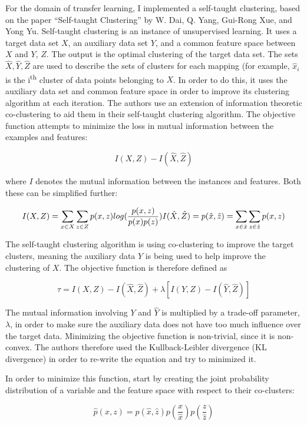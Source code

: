 \documentclass[
]{article}
\date{}
\begin{document}
For the domain of transfer learning, I implemented a self-taught
clustering, based on the paper ``Self-taught Clustering'' by W. Dai, Q.
Yang, Gui-Rong Xue, and Yong Yu. Self-taught clustering is an instance
of unsupervised learning. It uses a target data set \(X\), an auxiliary
data set \(Y\), and a common feature space between \(X\) and \(Y\),
\(Z\). The output is the optimal clustering of the target data set. The
sets \(\hat X, \hat Y, \hat Z\) are used to describe the sets of
clusters for each mapping (for example, \(\hat x_i\) is the
i\textsuperscript{th} cluster of data points belonging to \(X\). In
order to do this, it uses the auxiliary data set and common feature
space in order to improve its clustering algorithm at each iteration.
The authors use an extension of information theoretic co-clustering to
aid them in their self-taught clustering algorithm. The objective
function attempts to minimize the loss in mutual information between the
examples and features:

\[I(X, Z) - I(\hat X, \hat Z)\]

where \(I\) denotes the mutual information between the instances and
features. Both these can be simplified further:

\[I(X, Z) = \sum_{x\in X}\sum_{z\in Z}p(x, z)log(\frac{p(x, z)}{p(x)p(z)}) \\I(\hat X, \hat Z) = p(\hat x, \hat z) = \sum_{x\in\hat x}\sum_{z\in\hat z}p(x, z)\]

The self-taught clustering algorithm is using co-clustering to improve
the target clusters, meaning the auxiliary data \(Y\) is being used to
help improve the clustering of \(X\). The objective function is
therefore defined as

\[\tau = I(X, Z) - I(\hat X, \hat Z) + \lambda\left[I(Y, Z) - I(\hat Y, \hat Z)\right]\]

The mutual information involving \(Y\) and \(\hat Y\) is multiplied by a
trade-off parameter, \(\lambda\), in order to make sure the auxiliary
data does not have too much influence over the target data. Minimizing
the objective function is non-trivial, since it is non-convex. The
authors therefore used the Kullback-Leibler divergence (KL divergence)
in order to re-write the equation and try to minimized it.

In order to minimize this function, start by creating the joint
probability distribution of a variable and the feature space with
respect to their co-clusters:

\[\hat p(x, z) = p(\hat x, \hat z) p\left(\frac{x}{\hat x}\right)p\left(\frac{z}{\hat z}\right)\]
\end{document}
